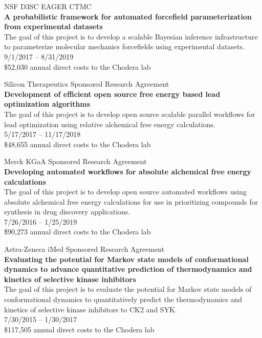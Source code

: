 \documentclass[10pt]{article}
\begin{document}
\vspace{1.5ex}

NSF D3SC EAGER CTMC \\
{\bf A probabilistic framework for automated forcefield parameterization from experimental datasets} \\
The goal of this project is to develop a scalable Bayesian inference infrastructure to parameterize molecular mechanics forcefields using experimental datasets. \\
9/1/2017 -- 8/31/2019 \\
\$52,030 annual direct costs to the Chodera lab

\vspace{1.5ex}

Silicon Therapeutics Sponsored Research Agreement \\
{\bf Development of efficient open source free energy based lead optimization algorithms} \\
The goal of this project is to develop open source scalable parallel workflows for lead optimization using relative alchemical free energy calculations. \\
5/17/2017 -- 11/17/2018\\
\$48,655 annual direct costs to the Chodera lab

\vspace{1.5ex}

Merck KGaA Sponsored Research Agreement \\
{\bf Developing automated workflows for absolute alchemical free energy calculations} \\
The goal of this project is to develop open source automated workflows using absolute alchemical free energy calculations for use in prioritizing compounds for synthesis in drug discovery applications. \\
7/26/2016 -- 1/25/2019 \\
\$90,273 annual direct costs to the Chodera lab

\vspace{1.5ex}

Astra-Zeneca iMed Sponsored Research Agreement \\
{\bf Evaluating the potential for Markov state models of conformational dynamics to advance quantitative prediction of thermodynamics and kinetics of selective kinase inhibitors} \\
The goal of this project is to evaluate the potential for Markov state models of conformational dynamics to quantitatively predict the thermodynamics and kinetics of selective kinase inhibitors to CK2 and SYK. \\
7/30/2015 -- 1/30/2017 \\
\$117,505 annual direct costs to the Chodera lab
\end{document}
